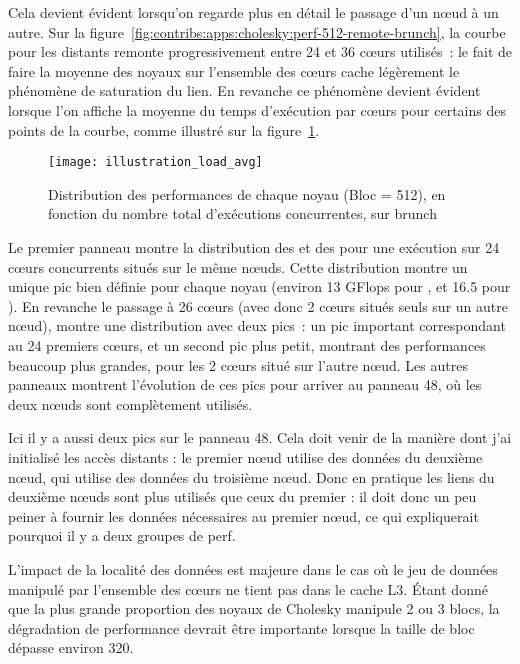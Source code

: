 Cela devient évident lorsqu'on regarde plus en détail le passage d'un nœud à un autre.
Sur la figure~\ref{fig:contribs:apps:cholesky:perf-512-remote-brunch}, la courbe pour les \gemm distants remonte progressivement entre 24 et 36 cœurs utilisés~: le fait de faire la moyenne des noyaux sur l'ensemble des cœurs cache légèrement le phénomène de saturation du lien.
En revanche ce phénomène devient évident lorsque l'on affiche la moyenne du temps d'exécution par cœurs pour certains des points de la courbe, comme illustré sur la figure~\ref{fig:contribs:apps:cholesky:distrib-load-512}.

\begin{figure}[ht]
  \centering
  \texttt{[image: illustration\_load\_avg]}
  \caption{Distribution des performances de chaque noyau (Bloc = 512), en fonction du nombre total d'exécutions concurrentes, sur brunch}\label{fig:contribs:apps:cholesky:distrib-load-512}
\end{figure}

Le premier panneau montre la distribution des \gemm et des \potrf pour une exécution sur 24 cœurs concurrents situés sur le même nœuds.
Cette distribution montre un unique pic bien définie pour chaque noyau (environ 13 GFlops pour \potrf, et 16.5 pour \gemm).
En revanche le passage à 26 cœurs (avec donc 2 cœurs situés seuls sur un autre nœud), montre une distribution avec deux pics~: un pic important correspondant au 24 premiers cœurs, et un second pic plus petit, montrant des performances beaucoup plus grandes, pour les 2 cœurs situé sur l'autre nœud.
Les autres panneaux montrent l'évolution de ces pics pour arriver au panneau 48, où les deux nœuds sont complètement utilisés.

\begin{todo}
  Ici il y a aussi deux pics sur le panneau 48. Cela doit venir de la manière dont j'ai initialisé les accès distants : le premier nœud utilise des données du deuxième nœud, qui utilise des données du troisième nœud. Donc en pratique les liens du deuxième nœuds sont plus utilisés que ceux du premier : il doit donc un peu peiner à fournir les données nécessaires au premier nœud, ce qui expliquerait pourquoi il y a deux groupes de perf.
\end{todo}


L'impact de la localité des données est majeure dans le cas où le jeu de données manipulé par l'ensemble des cœurs ne tient pas dans le cache L3.
Étant donné que la plus grande proportion des noyaux de Cholesky manipule 2 ou 3 blocs, la dégradation de performance devrait être importante lorsque la taille de bloc dépasse environ 320.

